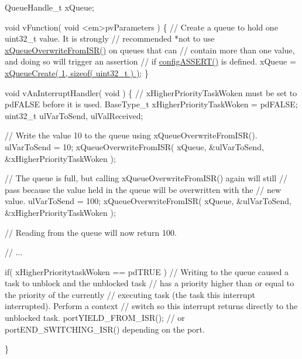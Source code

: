 \begin{DoxyPre} QueueHandle\_t xQueue;\end{DoxyPre}



\begin{DoxyPre} void vFunction( void <em>pvParameters )
 \{
    // Create a queue to hold one uint32\_t value.  It is strongly
    // recommended *not to use \hyperlink{queue_8h_abdcd6a86ef82034d002193e79cfd3ce8}{xQueueOverwriteFromISR()} on queues that can
    // contain more than one value, and doing so will trigger an assertion
    // if \hyperlink{_free_r_t_o_s_8h_a228c70cd48927d6ab730ed1a6dfbe35f}{configASSERT()} is defined.
    xQueue = \hyperlink{queue_8h_aeb858b824bd74a934ea7ebb81af2a6bb}{xQueueCreate( 1, sizeof( uint32\_t ) )};
\}\end{DoxyPre}



\begin{DoxyPre}void vAnInterruptHandler( void )
\{
// xHigherPriorityTaskWoken must be set to pdFALSE before it is used.
BaseType\_t xHigherPriorityTaskWoken = pdFALSE;
uint32\_t ulVarToSend, ulValReceived;
\begin{DoxyVerb}// Write the value 10 to the queue using xQueueOverwriteFromISR().
ulVarToSend = 10;
xQueueOverwriteFromISR( xQueue, &ulVarToSend, &xHigherPriorityTaskWoken );

// The queue is full, but calling xQueueOverwriteFromISR() again will still
// pass because the value held in the queue will be overwritten with the
// new value.
ulVarToSend = 100;
xQueueOverwriteFromISR( xQueue, &ulVarToSend, &xHigherPriorityTaskWoken );

// Reading from the queue will now return 100.

// ...

if( xHigherPrioritytaskWoken == pdTRUE )
{
    // Writing to the queue caused a task to unblock and the unblocked task
    // has a priority higher than or equal to the priority of the currently
    // executing task (the task this interrupt interrupted).  Perform a context
    // switch so this interrupt returns directly to the unblocked task.
    portYIELD_FROM_ISR(); // or portEND_SWITCHING_ISR() depending on the port.
}
\end{DoxyVerb}

\}
 \end{DoxyPre}
 